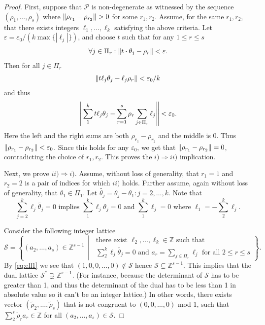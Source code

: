 \documentclass[11pt]{article}
\theoremstyle{definition}
\numberwithin{equation}{section}
\newcommand\+{\mkern2mu}
\newcommand{\Z}{\mathbb{Z}}
\newcommand{\Sl}{\mathcal{S}}
\newcommand{\ep}{\varepsilon}
\newcommand{\1}{\mathbf 1}
\newcommand{\tthe}[1][j]{\tilde{\theta_{#1}}}
\newcommand{\trho}{\tilde{\rho}}
\DeclarePairedDelimiter{\znorm}{\lVert}{\rVert}
\begin{document}
\begin{proof}
First, suppose that $\mathcal{P}$ is non-degenerate as witnessed by the sequence $(\rho_1,\dots, \rho_s)$ where $\znorm{\rho_{r_1} - \rho_{r_2}} > 0$ for some $r_1, r_2$. Assume, for the same $r_1,r_2$, that there exists integers $\ell_1,\dots, \ell_k$ satisfying the above criteria. Let $\ep = \ep_0/(k \max\{|\ell_j|\})$, and choose $t$ such that  for any $1 \leq r \leq s$ 
\begin{equation*} \forall j \in \Pi_r : \znorm{ t \cdot \theta_j - \rho_r} < \ep.
\end{equation*}
Then for all $j\in \Pi_r$
\[ \znorm{ t \ell_j \theta_j - \ell_j \rho_r} < \ep_0/k\] 
and thus
\[ \znorm*{ \sum_1^k t \ell_j \theta_j - \sum_{r=1}^s \rho_r \sum_{j \in \Pi_r} \ell_j } < \ep_0.
\]
Here the left and the right sums are both $\rho_{r_1}-\rho_{r_2}$ and the middle is 0. Thus $\znorm{\rho_{r_1} - \rho_{r_2}} < \ep_0$. Since this holds for any $\ep_0$, we get that $\znorm{\rho_{r_1} - \rho_{r_2}}=0$, contradicting the choice of $r_1,r_2$. This proves the $i) \Rightarrow ii)$ implication.

Next, we prove $ii) \Rightarrow i)$. Assume, without loss of generality, that $r_1 = 1$ and $r_2 = 2$ is a pair of indices for which $ii)$ holds. Further assume, again without loss of generality, that $\theta_1 \in \Pi_1$.  Let $\tthe = \theta_j - \theta_1 : j = 2, \dots, k$. Note that 
\begin{equation}\label{eq:ell1} \sum_{j=2}^k \ell_j \tthe = 0 \mbox{ implies } \sum_1^k \ell_j \theta_j = 0 \mbox{ and } \sum_1^k \ell_j = 0 \mbox{ where $\ell_1 = -\sum_2^k \ell_j$}.\end{equation}

Consider the following integer lattice 
\[ \Sl = \left\{ (a_2, \dots, a_s) \in \Z^{s-1} \ \middle\vert\ \begin{gathered}\text{there exist } \ell_2, \dots, \ell_k \in \Z \text{ such that } \\ \sum_2^k \ell_j \tthe = 0 \text{ and } a_r = \sum_{j \in \Pi_r} \ell_j  \text{ for all } 2 \leq r \leq s \end{gathered} \right\}.\]
By \eqref{eq:ell1} we see that $(1,0,0,\dots,0) \not \in \Sl$ hence $\Sl \subsetneq \Z^{s-1}$. This implies that the dual lattice $\Sl^* \supsetneq \Z^{s-1}$. (For instance, because the determinant of $\Sl$ has to be greater than 1, and thus the determinant of the dual has to be less than 1 in absolute value so it can't be an integer lattice.) In other words, there exists vector $(\trho_2,\dots, \trho_s)$ that is not congruent to $(0,0,\dots,0)$ mod 1, such that $\sum_2^s \trho_r a_r \in \Z$ for all $(a_2,\dots,a_s) \in \Sl$. 


\end{proof}
\end{document}
